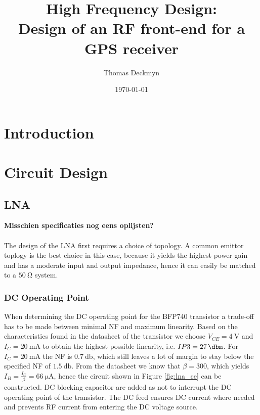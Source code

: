 \documentclass[a4paper]{article}        %
\title{High Frequency Design: \\ Design of an RF front-end for a GPS receiver}
\author{Thomas Deckmyn}
\date{\today}
\begin{document}
\maketitle

\section{Introduction}
\section{Circuit Design}
	\subsection{LNA}

	\textbf{Misschien specificaties nog eens oplijsten?}\\\\
	The design of the LNA first requires a choice of topology. A common emittor toplogy is the best choice in this case, because it yields the highest power gain and has a moderate input and output impedance, hence it can easily be matched to a $\SI{50}{\ohm}$ system.
		\subsubsection{DC Operating Point}
			When determining the DC operating point for the BFP740 transistor a trade-off has to be made between minimal NF and maximum linearity. Based on the characteristics found in the datasheet\cite{transdatasheet} of the transistor we choose $V_{CE} = \SI{4}{\volt}$ and $I_C = \SI{20}{\milli\ampere}$ to obtain the highest possible linearity, i.e. $IP3 = \SI{27}{\dbm} $. For $I_C = \SI{20}{\milli\ampere}$ the NF is $\SI{0.7}{\decibel}$, which still leaves a lot of margin to stay below the specified NF of $\SI{1.5}{\decibel}$. From the datasheet we know that $\beta = 300$, which yields $I_B = \frac{I_C}{\beta} = \SI{66}{\micro\ampere}$, hence the circuit shown in Figure \ref{fig:lna_ce} can be constructed. DC blocking capacitor are added as not to interrupt the DC operating point of the transistor. The DC feed ensures DC current where needed and prevents RF current from entering the DC voltage source. \\
\end{document}
